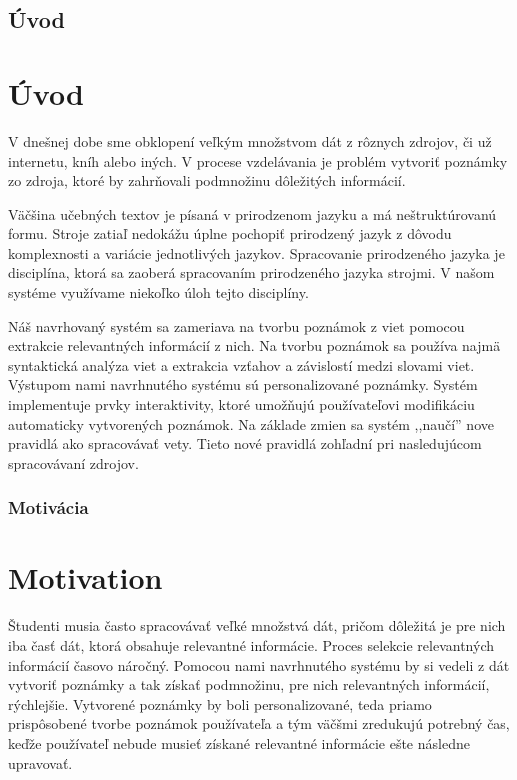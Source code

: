 \newpage
{}
{
	\section{Úvod}
}
{
	\chapter{Úvod}
}
V dnešnej dobe sme obklopení veľkým množstvom dát z rôznych zdrojov, či už internetu, kníh alebo iných. V procese vzdelávania je problém vytvoriť poznámky zo zdroja, ktoré by zahrňovali podmnožinu dôležitých informácií. 

Väčšina učebných textov je písaná v prirodzenom jazyku a má neštruktúrovanú formu. Stroje zatiaľ nedokážu úplne pochopiť prirodzený jazyk z dôvodu komplexnosti a variácie jednotlivých jazykov. Spracovanie prirodzeného jazyka je disciplína, ktorá sa zaoberá spracovaním prirodzeného jazyka strojmi. V našom systéme využívame niekoľko úloh tejto disciplíny.

Náš navrhovaný systém sa zameriava na tvorbu poznámok z viet pomocou extrakcie relevantných informácií z nich. Na tvorbu poznámok sa používa najmä syntaktická analýza viet a extrakcia vzťahov a závislostí medzi slovami viet. Výstupom nami navrhnutého systému sú personalizované poznámky. Systém implementuje prvky interaktivity, ktoré umožňujú používateľovi modifikáciu automaticky vytvorených poznámok. Na základe zmien sa systém ,,naučí'' nove pravidlá ako spracovávať vety. Tieto nové pravidlá zohľadní pri nasledujúcom spracovávaní zdrojov.

{
	\subsection{Motivácia}
}
{
	\chapter{Motivation}
}
Študenti musia často spracovávať veľké množstvá dát, pričom dôležitá je pre nich iba časť dát, ktorá obsahuje relevantné informácie. Proces selekcie relevantných informácií časovo náročný. Pomocou nami navrhnutého systému by si vedeli z dát vytvoriť poznámky a tak získať podmnožinu, pre nich relevantných informácií, rýchlejšie. Vytvorené poznámky by boli personalizované, teda priamo prispôsobené tvorbe poznámok používateľa a tým väčšmi zredukujú potrebný čas, keďže používateľ nebude musieť získané  relevantné informácie ešte následne upravovať.

